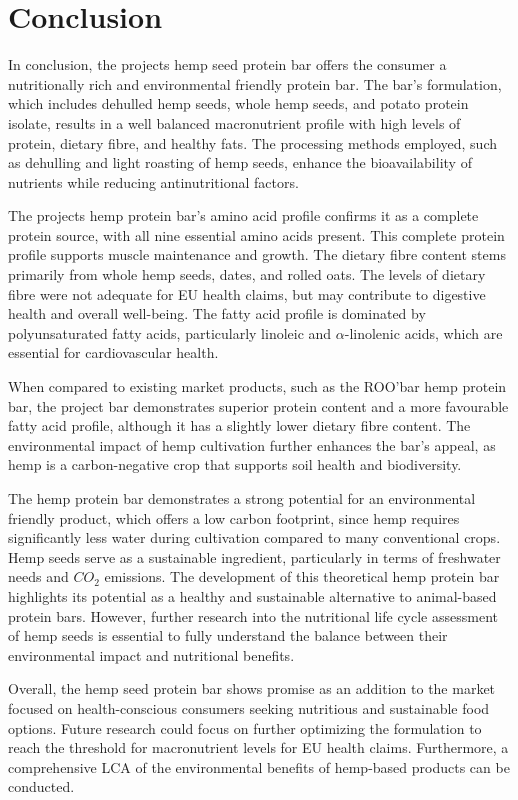 \section{Conclusion}
In conclusion, the projects hemp seed protein bar offers the consumer a nutritionally rich and environmental friendly protein bar. The bar's formulation, which includes dehulled hemp seeds, whole hemp seeds, and potato protein isolate, results in a well balanced macronutrient profile with high levels of protein, dietary fibre, and healthy fats. The processing methods employed, such as dehulling and light roasting of hemp seeds, enhance the bioavailability of nutrients while reducing antinutritional factors.


\vspace{1em}
The projects hemp protein bar's amino acid profile confirms it as a complete protein source, with all nine essential amino acids present. This complete protein profile supports muscle maintenance and growth. The dietary fibre content stems primarily from whole hemp seeds, dates, and rolled oats. The levels of dietary fibre were not adequate for EU health claims, but may  contribute to digestive health and overall well-being. The fatty acid profile is dominated by polyunsaturated fatty acids, particularly linoleic and $\alpha$-linolenic acids, which are essential for cardiovascular health.

\vspace{1em}
When compared to existing market products, such as the ROO'bar hemp protein bar, the project bar demonstrates superior protein content and a more favourable fatty acid profile, although it has a slightly lower dietary fibre content. The environmental impact of hemp cultivation further enhances the bar's appeal, as hemp is a carbon-negative crop that supports soil health and biodiversity.

\vspace{1em}
The hemp protein bar demonstrates a strong potential for an environmental friendly product, which offers a low carbon footprint, since hemp requires significantly less water during cultivation compared to many conventional crops. Hemp seeds serve as a sustainable ingredient, particularly in terms of freshwater needs and $CO_2$ emissions. The development of this theoretical hemp protein bar highlights its potential as a healthy and sustainable alternative to animal-based protein bars. However, further research into the nutritional life cycle assessment of hemp seeds is essential to fully understand the balance between their environmental impact and nutritional benefits.

\vspace{1em}
Overall, the hemp seed protein bar shows promise as an addition to the market focused on health-conscious consumers seeking nutritious and sustainable food options. Future research could focus on further optimizing the formulation to reach the threshold for macronutrient levels for EU health claims. Furthermore, a comprehensive LCA of the environmental benefits of hemp-based products can be conducted.

